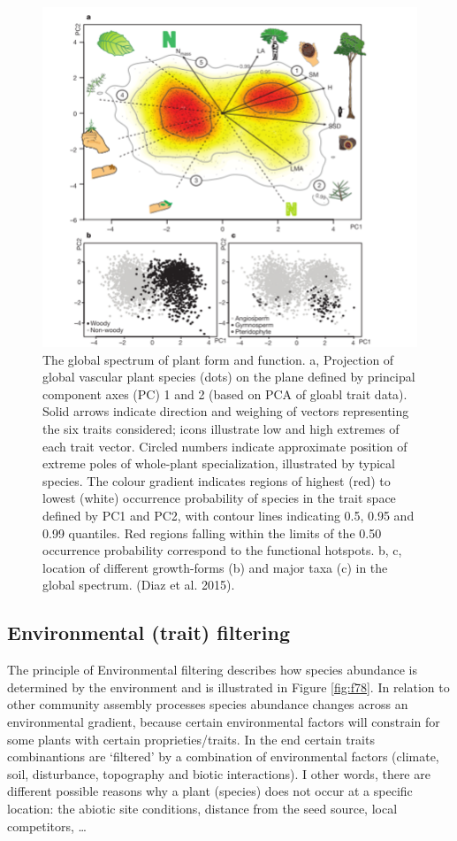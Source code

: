 \documentclass[12pt,oneside]{book}
\begin{document}
\begin{figure}

{\centering \includegraphics[width=0.8\linewidth]{figures/chap7/f77_PES} 

}

\caption{The global spectrum of plant form and function. a, Projection of global vascular plant species (dots) on the plane defined by principal component axes (PC) 1 and 2 (based on PCA of gloabl trait data). Solid arrows indicate direction and weighing of vectors representing the six traits considered; icons illustrate low and high extremes of each trait vector. Circled numbers indicate approximate position of extreme poles of whole-plant specialization, illustrated by typical species. The colour gradient indicates regions of highest (red) to lowest (white) occurrence probability of species in the trait space defined by PC1 and PC2, with contour lines indicating 0.5, 0.95 and 0.99 quantiles. Red regions falling within the limits of the 0.50 occurrence probability correspond to the functional hotspots. b, c, location of different growth-forms (b) and major taxa (c) in the global spectrum. (Diaz et al. 2015).}\label{fig:f77}
\end{figure}

\subsection{Environmental (trait)
filtering}\label{environmental-trait-filtering}

The principle of Environmental filtering describes how species abundance
is determined by the environment and is illustrated in Figure
\ref{fig:f78}. In relation to other community assembly processes species
abundance changes across an environmental gradient, because certain
environmental factors will constrain for some plants with certain
proprieties/traits. In the end certain traits combinantions are
`filtered' by a combination of environmental factors (climate, soil,
disturbance, topography and biotic interactions). I other words, there
are different possible reasons why a plant (species) does not occur at a
specific location: the abiotic site conditions, distance from the seed
source, local competitors, \ldots{}
\end{document}
